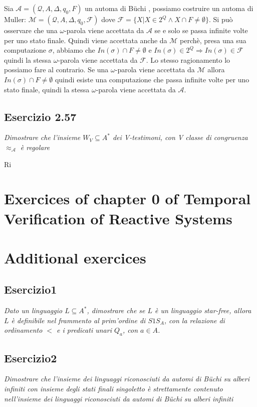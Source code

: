 \documentclass[12pt]{article}
\newcommand{\A}{\ensuremath{\mathcal{A}}\xspace}
\newcommand{\Buchi}{\ensuremath{\mathcal{A} = (\mathcal{Q},A,\Delta,q_0,F)}\xspace}
\newcommand{\buchi}{B\"uchi }
\begin{document}
Sia $\Buchi$ un automa di \buchi, possiamo costruire un automa di Muller: $\mathcal{M} = (\mathcal{Q},A,\Delta,q_0,\mathcal{F})$ dove $\mathcal{F} = \{ X | X \in 2^Q \land X \cap F \neq \emptyset\}$. Si può osservare che una $\omega$-parola viene accettata da $\A$ se e solo se passa infinite volte per uno stato finale. Quindi viene accettata anche da $\mathcal{M}$ perchè, presa una sua computazione $\sigma$, abbiamo che $In(\sigma) \cap F \neq \emptyset $ e $ In(\sigma) \in 2^Q \Rightarrow In(\sigma) \in \mathcal{F}$ quindi la stessa $\omega$-parola viene accettata da $\mathcal{F}$. Lo stesso ragionamento lo possiamo fare al contrario. Se una $\omega$-parola viene accettata da $\mathcal{M}$ allora $In(\sigma) \cap F \neq \emptyset $ quindi esiste una computazione che passa infinite volte per uno stato finale, quindi 
la stessa $\omega$-parola viene accettata da $\A$. 

\subsection*{Esercizio 2.57}
\textit{Dimostrare che l'insieme $W_V\subseteq A^*$ dei V-testimoni, con V classe di congruenza $\approx_\mathcal{A}$ è regolare}

Ri


\section{Exercices of chapter 0 of Temporal Verification of Reactive Systems}

\section{Additional exercices}
\subsection*{Esercizio1}
\textit{Dato un linguaggio $L \subseteq A^*$, dimostrare che se $L$ è un linguaggio star-free, allora $L$ è definibile nel frammento al prim'ordine di $S1S_A$, con la relazione di ordinamento $<$ e i predicati unari $Q_a$, con $a \in A$.}


\subsection*{Esercizio2}
\textit{Dimostrare che l'insieme dei linguaggi riconosciuti da automi di \buchi su alberi infiniti con insieme degli stati finali singoletto è strettamente contenuto nell'insieme dei linguaggi riconosciuti da automi di \buchi su alberi infiniti}
\end{document}
